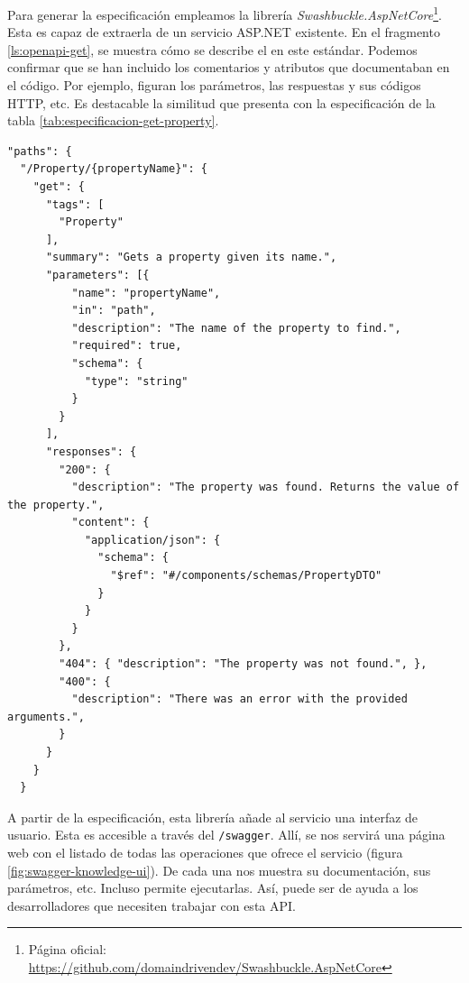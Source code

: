 
Para generar la especificación empleamos la librería \emph{Swashbuckle.AspNetCore}\footnote{Página oficial: \url{https://github.com/domaindrivendev/Swashbuckle.AspNetCore}}. Esta es capaz de extraerla de un servicio ASP.NET existente. En el fragmento \ref{ls:openapi-get}, se muestra cómo se describe el  en este estándar. Podemos confirmar que se han incluido los comentarios y atributos que documentaban en el código. Por ejemplo, figuran los parámetros, las respuestas y sus códigos HTTP, etc. Es destacable la similitud que presenta con la especificación de la tabla \ref{tab:especificacion-get-property}.

\begin{lstlisting}[style=json,caption={Especificación OpenAPI del método para obtener una propiedad del conocimiento (\lstinline{GetProperty}). \protect\footnotemark},captionpos=b, label=ls:openapi-get]
"paths": {
  "/Property/{propertyName}": {
    "get": {
      "tags": [
        "Property"
      ],
      "summary": "Gets a property given its name.",
      "parameters": [{
          "name": "propertyName",
          "in": "path",
          "description": "The name of the property to find.",
          "required": true,
          "schema": {
            "type": "string"
          }
        }
      ],
      "responses": {
        "200": {
          "description": "The property was found. Returns the value of the property.",
          "content": {
            "application/json": {
              "schema": {
                "$ref": "#/components/schemas/PropertyDTO"
              }
            }
          }
        },
        "404": { "description": "The property was not found.", },
        "400": {
          "description": "There was an error with the provided arguments.",
        }
      }
    }
  }
\end{lstlisting}


A partir de la especificación, esta librería añade al servicio una interfaz de usuario. Esta es accesible a través del  \texttt{/swagger}. Allí, se nos servirá una página web con el listado de todas las operaciones que ofrece el servicio (figura \ref{fig:swagger-knowledge-ui}). De cada una nos muestra su documentación, sus parámetros, etc. Incluso permite ejecutarlas. Así, puede ser de ayuda a los desarrolladores que necesiten trabajar con esta API.

